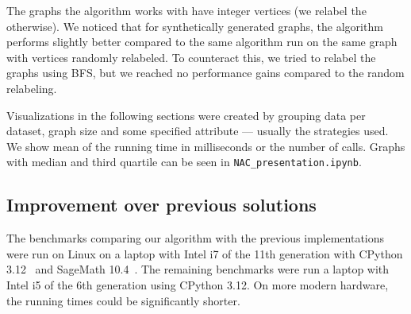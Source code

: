 The graphs the algorithm works with have integer vertices (we relabel the otherwise).
We noticed that for synthetically generated graphs,
the algorithm performs slightly better compared to
the same algorithm run on the same graph with vertices randomly relabeled.
To counteract this, we tried to relabel the graphs using BFS,
but we reached no performance gains compared to the random relabeling.

Visualizations in the following sections were created by grouping data per dataset,
graph size and some specified attribute --- usually the strategies used.
%
We show mean of the running time in milliseconds or
the number of \IsNACColoring{} calls.
%
Graphs with median and third quartile can be seen in \texttt{NAC\_presentation.ipynb}.


\subsection{Improvement over previous solutions}

The benchmarks comparing our algorithm with the previous implementations
were run on Linux on a laptop with Intel i7 of the 11th generation
with CPython 3.12~\cite{cpython} and SageMath 10.4~\cite{sagemath}.
The remaining benchmarks were run a laptop with Intel i5 of the 6th generation
using CPython 3.12.
On more modern hardware, the running times could be significantly shorter.

